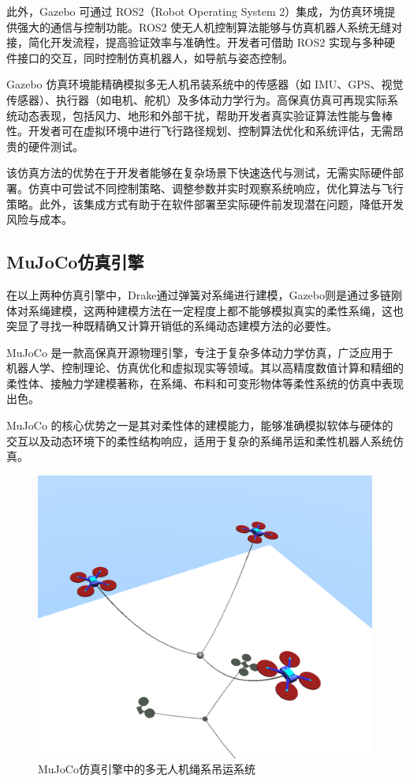 \documentclass[lang=chs, degree=master, blindreview=false, winfonts=true]{yanputhesis}
\begin{document}
此外，Gazebo 可通过 ROS2（Robot Operating System 2）集成，为仿真环境提供强大的通信与控制功能。ROS2 使无人机控制算法能够与仿真机器人系统无缝对接，简化开发流程，提高验证效率与准确性。开发者可借助 ROS2 实现与多种硬件接口的交互，同时控制仿真机器人，如导航与姿态控制。

Gazebo 仿真环境能精确模拟多无人机吊装系统中的传感器（如 IMU、GPS、视觉传感器）、执行器（如电机、舵机）及多体动力学行为。高保真仿真可再现实际系统动态表现，包括风力、地形和外部干扰，帮助开发者真实验证算法性能与鲁棒性。开发者可在虚拟环境中进行飞行路径规划、控制算法优化和系统评估，无需昂贵的硬件测试。

该仿真方法的优势在于开发者能够在复杂场景下快速迭代与测试，无需实际硬件部署。仿真中可尝试不同控制策略、调整参数并实时观察系统响应，优化算法与飞行策略。此外，该集成方式有助于在软件部署至实际硬件前发现潜在问题，降低开发风险与成本。

\subsection{MuJoCo仿真引擎}
在以上两种仿真引擎中，Drake通过弹簧对系绳进行建模，Gazebo则是通过多链刚体对系绳建模，这两种建模方法在一定程度上都不能够模拟真实的柔性系绳，这也突显了寻找一种既精确又计算开销低的系绳动态建模方法的必要性。

MuJoCo 是一款高保真开源物理引擎，专注于复杂多体动力学仿真，广泛应用于机器人学、控制理论、仿真优化和虚拟现实等领域。其以高精度数值计算和精细的柔性体、接触力学建模著称，在系绳、布料和可变形物体等柔性系统的仿真中表现出色。

MuJoCo 的核心优势之一是其对柔性体的建模能力，能够准确模拟软体与硬体的交互以及动态环境下的柔性结构响应，适用于复杂的系绳吊运和柔性机器人系统仿真。

\begin{figure}[hbt!]
	\centering
	\includegraphics[width=34pc]{picture/5_3.png} 
	\caption{MuJoCo仿真引擎中的多无人机绳系吊运系统} 
	\label{5_3}
\end{figure}
\end{document}
